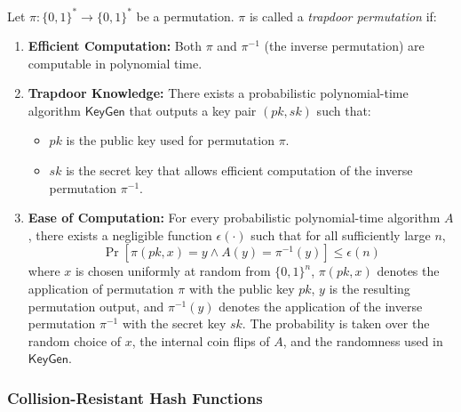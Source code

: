 \documentclass{iacrtrans}
\begin{document}
\begin{definition}
	Let $\pi: \{0,1\}^* \to \{0,1\}^*$ be a permutation. $\pi$ is called a \textit{trapdoor permutation} if:
	\begin{enumerate}
		\item \textbf{Efficient Computation:} Both $\pi$ and $\pi^{-1}$ (the inverse permutation) are computable in polynomial time.
		\item \textbf{Trapdoor Knowledge:} There exists a probabilistic polynomial-time algorithm $\mathsf{KeyGen}$ that outputs a key pair $(pk, sk)$ such that:
		      \begin{itemize}
		      	\item $pk$ is the public key used for permutation $\pi$.
		      	\item $sk$ is the secret key that allows efficient computation of the inverse permutation $\pi^{-1}$.
		      \end{itemize}
		\item \textbf{Ease of Computation:} For every probabilistic polynomial-time algorithm $A$, there exists a negligible function $\epsilon(\cdot)$ such that for all sufficiently large $n$,
		      \[
		      	\Pr[\pi(pk, x) = y \wedge A(y) = \pi^{-1}(y)] \leq \epsilon(n)
		      \]
		      where $x$ is chosen uniformly at random from $\{0,1\}^n$, $\pi(pk, x)$ denotes the application of permutation $\pi$ with the public key $pk$, $y$ is the resulting permutation output, and $\pi^{-1}(y)$ denotes the application of the inverse permutation $\pi^{-1}$ with the secret key $sk$. The probability is taken over the random choice of $x$, the internal coin flips of $A$, and the randomness used in $\mathsf{KeyGen}$.
	\end{enumerate}
\end{definition}

\subsubsection{Collision-Resistant Hash Functions}
\end{document}
